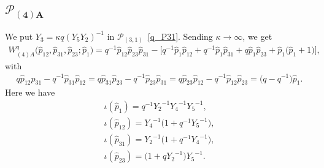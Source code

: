 \documentclass[pdftex]{sigma}
\numberwithin{equation}{section}
\begin{document}
\subsection[$\mathcal{P}_{(4)A}$]{$\boldsymbol{\mathcal{P}_{(4)A}}$}
We put $Y_3 = \kappa q (Y_5 Y_2)^{-1}$ in $\mathcal{P}_{(3,1)}$~\eqref{q_P31}. Sending $\kappa\to\infty$, we get
\begin{gather*}
 W^q_{(4)A}\big( \hat{p}_{12}, \hat{p}_{31}, \hat{p}_{23}; \hat{p}_1 \big)
 = q^{-1} \hat{p}_{12} \hat{p}_{23} \hat{p}_{31} - \big[ q^{-1} \hat{p}_1 \hat{p}_{12} + q^{-1} \hat{p}_1 \hat{p}_{31} + q \hat{p}_1 \hat{p}_{23} + \hat{p}_1 \big( \hat{p}_1 + 1\big)\big] ,
\end{gather*}
with
\begin{gather*}
 q \hat{p}_{12} \hat{p}_{31} - q^{-1} \hat{p}_{31} \hat{p}_{12} = q \hat{p}_{31} \hat{p}_{23} - q^{-1} \hat{p}_{23} \hat{p}_{31} = q \hat{p}_{23} \hat{p}_{12} - q^{-1} \hat{p}_{12} \hat{p}_{23}
= \big( q - q^{-1}\big) \hat{p}_1 .
\end{gather*}
Here we have
\begin{gather}
 \iota(\hat{p}_1) = q^{-1} {Y_2}^{-1}{Y_4}^{-1}{Y_5}^{-1} ,\nonumber \\
\iota(\hat{p}_{12}) = {Y_4}^{-1} \big( 1 + q^{-1} {Y_5}^{-1}\big) , \nonumber\\
 \iota(\hat{p}_{31}) = {Y_2}^{-1}\big( 1 + q^{-1} {Y_4}^{-1}\big) , \nonumber\\
 \iota(\hat{p}_{23}) =\big( 1 + q {Y_2}^{-1}\big) {Y_5}^{-1} . \label{q_P4A}
\end{gather}
\end{document}
